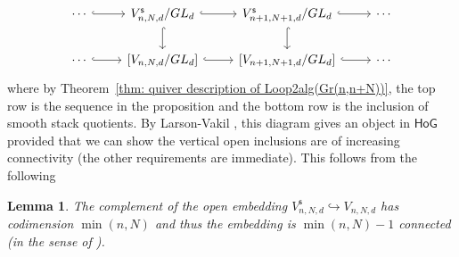 \documentclass{amsart}
\newtheorem{lemma}[theorem]{Lemma}
\theoremstyle{definition}
\newcommand{\HoG}{\textsf{HoG}}
\newcommand{\stable}{\mathsf{s}}
\begin{document}
\begin{equation} \label{eqn: HoG diagram for Loop2(d,BU)}
\begin{tikzcd}
    \cdots \arrow[r, hook]
    & V^{\stable}_{n,N,d}/GL_{d} \arrow[r, hook] \arrow[d, hook]
    & V^{\stable}_{n+1,N+1,d}/GL_{d}  \arrow[r, hook] \arrow[d, hook] & \cdots \\
    \cdots \arrow[r, hook]
    & \left[V_{n,N,d}/GL_{d} \right] \arrow[r, hook]
    & \left[V_{n+1,N+1,d}/GL_{d} \right] 
\arrow[r, hook] & \cdots
\end{tikzcd}
\end{equation}
where by Theorem~\ref{thm: quiver description of Loop2alg(Gr(n,n+N))},
the top row is the sequence in the proposition and the bottom row is
the inclusion of smooth stack quotients. By Larson-Vakil
\cite[Definition 3.1]{Larson-Vakil-BottPeriodicity}, this diagram
gives an object in $\HoG$ provided that we can show the vertical open
inclusions are of increasing connectivity (the other requirements are
immediate). This follows from the following
\begin{lemma}\label{lem: codimension of unstable locus for the Gr quiver}
The complement of the open embedding
$V^{\stable}_{n,N,d}\hookrightarrow V_{n,N,d}$ has codimension $\min
(n,N)$ and thus the embedding is $\min(n,N)-1$ \emph{connected} (in
the sense of \cite[Definition~2.1]{Larson-Vakil-BottPeriodicity}).
\end{lemma}
\end{document}
